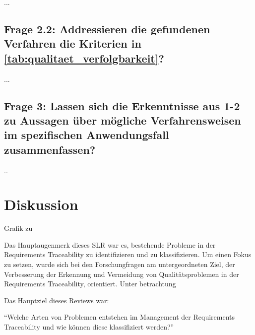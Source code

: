 ...

\subsection{Frage 2.2: Addressieren die gefundenen Verfahren die Kriterien in \ref{tab:qualitaet_verfolgbarkeit}?}
...

\subsection{Frage 3: Lassen sich die Erkenntnisse aus 1-2 zu Aussagen über mögliche Verfahrensweisen im spezifischen Anwendungsfall zusammenfassen?}
..

\section{Diskussion}

Grafik zu

Das Hauptaugenmerk dieses SLR war es, bestehende Probleme in der Requirements Traceability zu identifizieren und zu klassifizieren. Um einen Fokus zu setzen, wurde sich bei den Forschungfragen am untergeordneten Ziel, der Verbesserung der Erkennung und Vermeidung von Qualitätsproblemen in der Requirements Traceability, orientiert. Unter betrachtung 

Das Hauptziel dieses Reviews war:

\begin{center}
\enquote{Welche Arten von Problemen entstehen im Management der Requirements Traceability und wie können diese klassifiziert werden?}
\end{center}